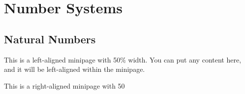 \section{Number Systems}

\subsection{Natural Numbers}

\begin{true}
This is a left-aligned minipage with 50\% width. You can put any content here, and it will be left-aligned within the minipage.
\end{true}
\begin{forthel}
This is a right-aligned minipage with 50%
\end{forthel}
